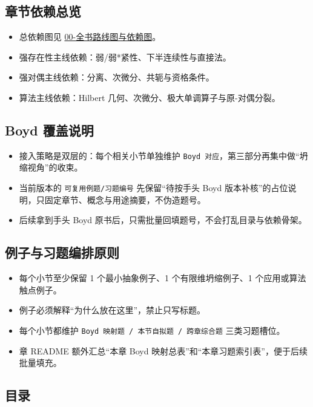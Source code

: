 \subsection*{章节依赖总览}

        \begin{itemize}
  \item 总依赖图见 \hyperref[front:roadmap]{00-全书路线图与依赖图}。
  \item 强存在性主线依赖：弱/弱*紧性、下半连续性与直接法。
  \item 强对偶主线依赖：分离、次微分、共轭与资格条件。
  \item 算法主线依赖：Hilbert 几何、次微分、极大单调算子与原-对偶分裂。
\end{itemize}

\subsection*{Boyd 覆盖说明}

        \begin{itemize}
  \item 接入策略是双层的：每个相关小节单独维护 \texttt{Boyd 对应}，第三部分再集中做“坍缩视角”的收束。
  \item 当前版本的 \texttt{可复用例题/习题编号} 先保留“待按手头 Boyd 版本补核”的占位说明，只固定章节、概念与用途摘要，不伪造题号。
  \item 后续拿到手头 Boyd 原书后，只需批量回填题号，不会打乱目录与依赖骨架。
\end{itemize}

\subsection*{例子与习题编排原则}

        \begin{itemize}
  \item 每个小节至少保留 1 个最小抽象例子、1 个有限维坍缩例子、1 个应用或算法触点例子。
  \item 例子必须解释“为什么放在这里”，禁止只写标题。
  \item 每个小节都维护 \texttt{Boyd 映射题 / 本节自拟题 / 跨章综合题} 三类习题槽位。
  \item 章 README 额外汇总“本章 Boyd 映射总表”和“本章习题索引表”，便于后续批量填充。
\end{itemize}

\subsection*{目录}

